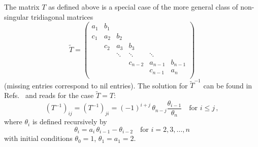 The matrix $T$ as defined above is a special case of the more general class of non-singular tridiagonal matrices
\begin{equation*}
    \tilde{T} = \begin{pmatrix}
        a_1 & b_1 \\
        c_1 & a_2 & b_2 \\
        & c_2 & a_3 & b_3 \\
        & & \ddots & \ddots & \ddots \\
        & & & c_{n-2} & a_{n-1} & b_{n-1} \\
        & & & & c_{n-1} & a_n \\
    \end{pmatrix}
\end{equation*}
(missing entries correspond to nil entries).
The solution for $\tilde{T}^{-1}$ can be found in Refs.~\cite{eigenvaluesoftrimat,invtrimat} and reads for the case $\tilde{T}=T$:
\begin{equation*}
    \left( T^{-1} \right)_{ij} = \left( T^{-1} \right)_{ji} = (-1)^{i+j} \, \theta_{n-j} \frac{\theta_{i-1}}{\theta_n} \quad \text{for } i \le j \,,
\end{equation*}
where $\theta_i$ is defined recursively by
\begin{equation*}
    \theta_i = a_i \, \theta_{i-1} - \theta_{i-2} \quad \text{for }i=2,3,\ldots,n
\end{equation*}
with initial conditions $\theta_0 = 1$, $\theta_1=a_1=2$.

